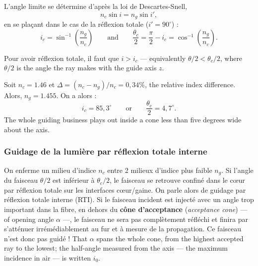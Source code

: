 L'angle limite se détermine d'après la loi de Descartes-Snell,
\begin{equation*}
  n_c \sin i = n_g \sin i',
\end{equation*}
en se plaçant dans le cas de la réflexion totale ($i' = 90^\circ$) :
\begin{equation*}
  i_c = \sin^{-1}\!\left(\frac{n_g}{n_c}\right)
  \qquad\text{and}\qquad
  \frac{\theta_c}{2} = \frac{\pi}{2} - i_c = \cos^{-1}\!\left(\frac{n_g}{n_c}\right).
\end{equation*}

\begin{prop}
  Pour avoir réflexion totale, il faut que $i > i_c$ --- equivalently
  $\theta/2 < \theta_c/2$, where $\theta/2$ is the angle the ray makes with the
  guide axis $z$.
\end{prop}

\begin{example}
  Soit $n_c = 1.46$ et
  $\Delta = (n_c - n_g)/n_c = 0{,}34\%$, the relative index difference. Alors,
  $n_g = 1.455$. On a alors :
  \[
    i_c = 85{,}3^\circ \qquad\text{or}\qquad \frac{\theta_c}{2} = 4{,}7^\circ .
  \]
  The whole guiding business plays out inside a cone less than five degrees
  wide about the axis.
\end{example}

\subsubsection{Guidage de la lumière par réflexion totale interne}
On enferme un milieu d'indice $n_c$ entre 2 milieux d'indice plus faible $n_g$.
Si l'angle du faisceau $\theta/2$ est inférieur à $\theta_c/2$, le faisceau se
retrouve confiné dans le cœur par réflexion totale sur les interfaces
cœur/gaine. On parle alors de guidage par réflexion totale interne (RTI). Si le
faisceau incident est injecté avec un angle trop important dans la fibre, en
dehors du \textbf{cône d'acceptance} (\textit{acceptance cone}) --- of opening
angle $\alpha$ ---, le faisceau ne sera pas complètement réfléchi et finira par
s'atténuer irrémédiablement au fur et à mesure de la propagation. Ce faisceau
n'est donc pas guidé ! That $\alpha$ spans the whole cone, from the highest
accepted ray to the lowest; the half-angle measured from the axis --- the
maximum incidence in air --- is written $i_0$.

